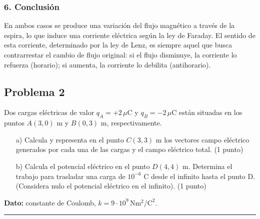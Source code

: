 \subsubsection*{6. Conclusión}
\begin{cajaconclusion}
En ambos casos se produce una variación del flujo magnético a través de la espira, lo que induce una corriente eléctrica según la ley de Faraday. El sentido de esta corriente, determinado por la ley de Lenz, es siempre aquel que busca contrarrestar el cambio de flujo original: si el flujo disminuye, la corriente lo refuerza (horario); si aumenta, la corriente lo debilita (antihorario).
\end{cajaconclusion}

\newpage

\subsection{Problema 2}
\label{subsec:P2_2023_jul_ord}

\begin{cajaenunciado}
Dos cargas eléctricas de valor $q_A = +2\,\mu\text{C}$ y $q_B = -2\,\mu\text{C}$ están situadas en los puntos $A(3,0)$ m y $B(0,3)$ m, respectivamente.
\begin{enumerate}
    \item[a)] Calcula y representa en el punto $C(3,3)$ m los vectores campo eléctrico generados por cada una de las cargas y el campo eléctrico total. (1 punto)
    \item[b)] Calcula el potencial eléctrico en el punto $D(4,4)$ m. Determina el trabajo para trasladar una carga de $10^{-6}$ C desde el infinito hasta el punto D. (Considera nulo el potencial eléctrico en el infinito). (1 punto)
\end{enumerate}
\textbf{Dato:} constante de Coulomb, $k=9\cdot10^{9}\,\text{N}\text{m}^2/\text{C}^2$.
\end{cajaenunciado}
\hrule

